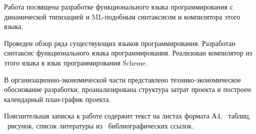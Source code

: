 \summarytitle

Работа посвящена разработке функционального языка программирования с динамической типизацией и ML-подобным синтаксисом и компилятора этого языка.

Проведен обзор ряда существующих языков программирования.
Разработан синтаксис функционального языка программирования.
Реализован компилятор из этого языка в язык программирования Scheme.

В организационно-экономической части представлено технико-экономическое обоснование разработки, проанализирована структура затрат проекта и построен календарный план-график проекта.

Пояснительная записка к работе содержит текст на \pageref{LastPage} листах формата А4, \tottab~таблиц, \totfig~рисунок, список литературы из \totbibref~библиографических ссылок.
